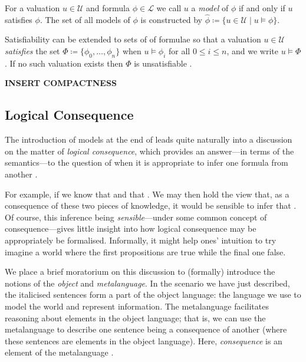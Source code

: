 \begin{definition}
	\label{definition:model}  For a valuation $u \in \mathcal{U}$ and formula $\phi \in \mathcal{L}$ we call $u$
	a \textit{model} of $\phi$ if and only if $u$ satisfies $\phi$. The set of all models of $\phi$ is constructed by $\hat
	{\phi}\coloneqq \{u \in \mathcal{U}\mid u \vDash \phi \}$.
\end{definition}

Satisfiability can be extended to sets of of formulae so that a valuation $u \in \mathcal{U}$ \textit{satisfies} the set
$\Phi \coloneqq \{\phi_{0}, \ldots , \phi_{n}\}$ when $u \vDash \phi_{i}$ for all $0 \leq i \leq n$, and we write
$u \vDash \Phi$. If no such valuation exists then $\Phi$ is unsatisfiable \cite[p. 31]{Ben1993Mathematical}.

\begin{definition}
	\label{definition:compactness} \textbf{INSERT COMPACTNESS}
\end{definition}

\subsection{Logical Consequence}
\label{subsection:logical-consequence} 

The introduction of models at the end of  leads quite naturally into a discussion on the
matter of \textit{logical consequence}, which provides an answer---in terms of the semantics---to the question of when it
is appropriate to infer one formula from another \cite[p. 408]{tarski1936consequence}.

For example, if we know that  and that .
We may then hold the view that, as a consequence of these two pieces of knowledge, it would be sensible to infer that .
Of course, this inference being \textit{sensible}---under some common concept of consequence---gives little insight into
how logical consequence may be appropriately be formalised. Informally, it might help ones' intuition to try imagine a
world where the first propositions are true while the final one false.

  We place a brief moratorium on this discussion to (formally) introduce the
notions of the \textit{object} and \textit{metalanguage}. In the scenario we have just described, the italicised
sentences form a part of the object language: the language we use to model the world and represent information. The
metalanguage facilitates reasoning about elements in the object language; that is, we can use the metalanguage to
describe one sentence being a consequence of another (where these sentences are elements in the object language). Here,
\textit{consequence} is an element of the metalanguage \cite[p 22]{Ben1993Mathematical}.

